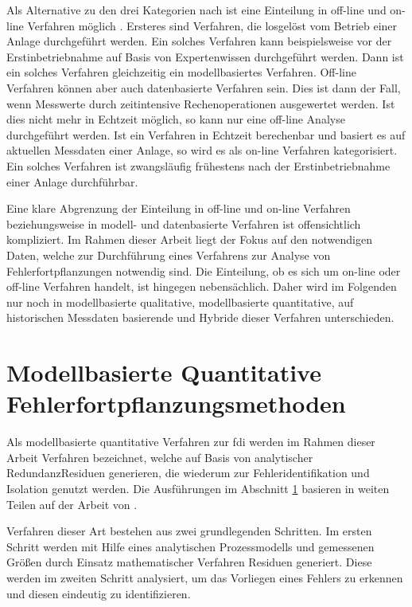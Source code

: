 Als Alternative zu den drei Kategorien nach \citeauthor{Venkatasubramanian_2003}\cite{Venkatasubramanian_2003} ist eine Einteilung in off-line und on-line Verfahren m\"oglich \cite{Kavcic_2001}. Ersteres sind Verfahren, die losgel\"ost vom Betrieb einer Anlage durchgef\"uhrt werden. Ein solches Verfahren kann beispielsweise vor der Erstinbetriebnahme auf Basis von Expertenwissen durchgef\"uhrt werden. Dann ist ein solches Verfahren gleichzeitig ein modellbasiertes Verfahren. Off-line Verfahren k\"onnen aber auch datenbasierte Verfahren sein. Dies ist dann der Fall, wenn Messwerte durch zeitintensive Rechenoperationen ausgewertet werden. Ist dies nicht mehr in Echtzeit m\"oglich, so kann nur eine off-line Analyse durchgef\"uhrt werden. \newline 
Ist ein Verfahren in Echtzeit berechenbar und basiert es auf aktuellen Messdaten einer Anlage, so wird es als on-line Verfahren kategorisiert. Ein solches Verfahren ist zwangsl\"aufig fr\"uhestens nach der Erstinbetriebnahme einer Anlage durchf\"uhrbar. 

Eine klare Abgrenzung der Einteilung in off-line und on-line Verfahren beziehungsweise in modell- und datenbasierte Verfahren ist offensichtlich kompliziert. Im Rahmen dieser Arbeit liegt der Fokus auf den notwendigen Daten, welche zur Durchf\"uhrung eines Verfahrens zur Analyse von Fehlerfortpflanzungen notwendig sind. Die Einteilung, ob es sich um on-line oder off-line Verfahren handelt, ist hingegen nebens\"achlich. Daher wird im Folgenden nur noch in modellbasierte qualitative, modellbasierte quantitative, auf historischen Messdaten basierende  und Hybride dieser Verfahren unterschieden. 
  
\section{Modellbasierte Quantitative Fehlerfortpflanzungsmethoden}\label{sec:fAna_modQuant}
Als modellbasierte quantitative Verfahren zur \ac{fdi} werden im Rahmen dieser Arbeit Verfahren bezeichnet, welche auf Basis von \glqq analytischer Redundanz\grqq { }Residuen generieren, die wiederum zur Fehleridentifikation und Isolation genutzt werden. Die Ausf\"uhrungen im Abschnitt \ref{sec:fAna_modQuant} basieren in weiten Teilen auf der Arbeit von \citeauthor{Venkatasubramanian_2003} \cite{Venkatasubramanian_2003}. 

Verfahren dieser Art bestehen aus zwei grundlegenden Schritten. Im ersten Schritt werden mit Hilfe eines analytischen Prozessmodells und gemessenen Gr\"o\ss{}en durch Einsatz mathematischer Verfahren Residuen generiert. Diese werden im zweiten Schritt analysiert, um das Vorliegen eines Fehlers zu erkennen und diesen eindeutig zu identifizieren.

